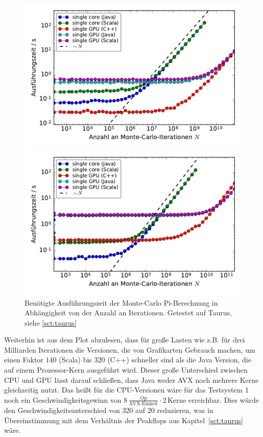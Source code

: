 \begin{figure}[H]
	\centering
	\begin{minipage}{0.5\linewidth}
		\includegraphics[width=\linewidth]{benchmarks-workload-scaling}
	\end{minipage}\begin{minipage}{0.5\linewidth}
		\includegraphics[width=\linewidth]{benchmarks-workload-scaling-taurus2}
	\end{minipage}
	\caption{Benötigte Ausführungszeit der Monte-Carlo Pi-Berechnung in Abhängigkeit von der Anzahl an Iterationen. Getestet auf Taurus, siehe \autoref{sct:taurus}}
	\label{fig:montepiworkloadscaling}
\end{figure}

Weiterhin ist aus dem Plot abzulesen, dass für große Lasten wie z.B. für drei Milliarden Iterationen die Versionen, die von Grafikarten Gebrauch machen, um einen Faktor $140$ (Scala) bis $320$ (C++) schneller sind als die Java Version, die auf einem Prozessor-Kern ausgeführt wird.
Dieser große Unterschied zwischen CPU und GPU lässt darauf schließen, dass Java weder AVX noch mehrere Kerne gleichzeitig nutzt.
Das heißt für die CPU-Versionen wäre für das Testsystem 1 noch ein Geschwindigkeitsgewinn von $8\,\frac{ \text{Op} }{ \text{AVX-Einheit} } \cdot 2\,\text{Kerne}$ erreichbar.
Dies würde den Geschwindigkeitsunterschied von $320$ auf $20$ reduzieren, was in Übereinstimmung mit dem Verhältnis der Peakflops aus Kapitel~\ref{sct:taurus} wäre.


